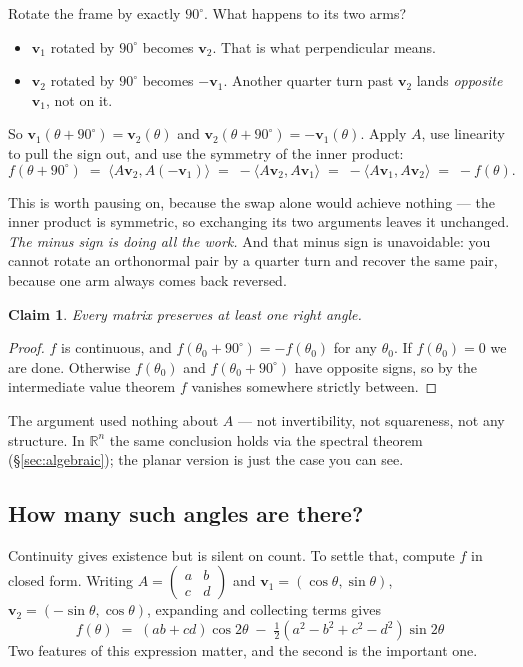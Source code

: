 \documentclass[11pt]{article}
\numberwithin{equation}{section}
\newcommand{\R}{\mathbb{R}}
\newcommand{\ip}[2]{\langle #1, #2 \rangle}
\newcommand{\vv}[1]{\mathbf{v}_{#1}}
\theoremstyle{plainish}
\newtheorem*{claim}{Claim}
\begin{document}
Rotate the frame by exactly $90^\circ$. What happens to its two arms?

\begin{itemize}\itemsep0.2em
\item $\vv1$ rotated by $90^\circ$ becomes $\vv2$. That is what perpendicular means.
\item $\vv2$ rotated by $90^\circ$ becomes $-\vv1$. Another quarter turn past
$\vv2$ lands \emph{opposite} $\vv1$, not on it.
\end{itemize}

\noindent
So $\vv1(\theta + 90^\circ) = \vv2(\theta)$ and $\vv2(\theta+90^\circ) = -\vv1(\theta)$.
Apply $A$, use linearity to pull the sign out, and use the symmetry of the
inner product:
\begin{equation}f(\theta+90^\circ)
\;=\; \ip{A\vv2}{A(-\vv1)}
\;=\; -\ip{A\vv2}{A\vv1}
\;=\; -\ip{A\vv1}{A\vv2}
\;=\; -f(\theta).
\end{equation}

This is worth pausing on, because the swap alone would achieve nothing --- the
inner product is symmetric, so exchanging its two arguments leaves it
unchanged. \emph{The minus sign is doing all the work.} And that minus sign is
unavoidable: you cannot rotate an orthonormal pair by a quarter turn and
recover the same pair, because one arm always comes back reversed.

\begin{claim}
Every matrix preserves at least one right angle.
\end{claim}

\begin{proof}
$f$ is continuous, and $f(\theta_0 + 90^\circ) = -f(\theta_0)$ for any
$\theta_0$. If $f(\theta_0) = 0$ we are done. Otherwise $f(\theta_0)$ and
$f(\theta_0+90^\circ)$ have opposite signs, so by the intermediate value
theorem $f$ vanishes somewhere strictly between.
\end{proof}

\noindent
The argument used nothing about $A$ --- not invertibility, not squareness, not
any structure. In $\R^n$ the same conclusion holds via the spectral theorem
(\S\ref{sec:algebraic}); the planar version is just the case you can see.

\subsection{How many such angles are there?}
\label{sec:uniqueness-f}

Continuity gives existence but is silent on count. To settle that, compute $f$
in closed form. Writing $A = \left(\begin{smallmatrix} a & b \\ c & d\end{smallmatrix}\right)$
and $\vv1 = (\cos\theta, \sin\theta)$, $\vv2 = (-\sin\theta, \cos\theta)$, expanding
and collecting terms gives
\begin{equation}\boxed{\;
f(\theta) \;=\; (ab + cd)\cos 2\theta \;-\; \tfrac12\left(a^2 - b^2 + c^2 - d^2\right)\sin 2\theta
\;}
\end{equation}
Two features of this expression matter, and the second is the important one.
\end{document}
